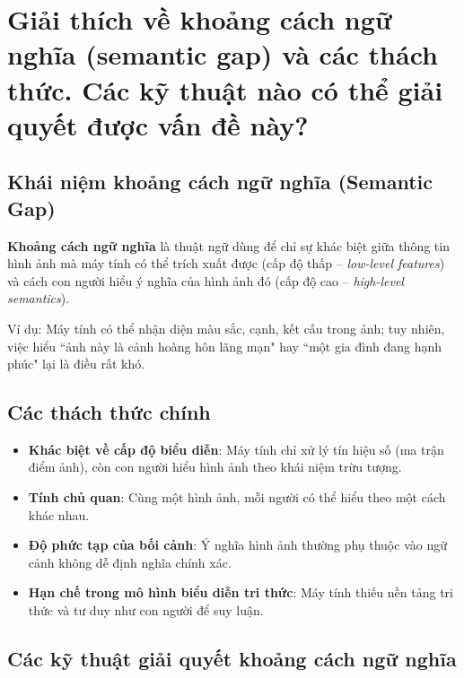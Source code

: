 \documentclass[12pt]{article}
\begin{document}
	\section{Giải thích về khoảng cách ngữ nghĩa (semantic gap) và các thách thức. Các kỹ thuật nào có thể giải quyết được vấn đề này?}
	
	\subsection{Khái niệm khoảng cách ngữ nghĩa (Semantic Gap)}
	
	\textbf{Khoảng cách ngữ nghĩa} là thuật ngữ dùng để chỉ sự khác biệt giữa thông tin hình ảnh mà máy tính có thể trích xuất được (cấp độ thấp -- \textit{low-level features}) và cách con người hiểu ý nghĩa của hình ảnh đó (cấp độ cao -- \textit{high-level semantics}).
	
	Ví dụ: Máy tính có thể nhận diện màu sắc, cạnh, kết cấu trong ảnh; tuy nhiên, việc hiểu ``ảnh này là cảnh hoàng hôn lãng mạn" hay ``một gia đình đang hạnh phúc" lại là điều rất khó.
	
	\subsection{Các thách thức chính}
	
	\begin{itemize}
	\item \textbf{Khác biệt về cấp độ biểu diễn}: Máy tính chỉ xử lý tín hiệu số (ma trận điểm ảnh), còn con người hiểu hình ảnh theo khái niệm trừu tượng.
	\item \textbf{Tính chủ quan}: Cùng một hình ảnh, mỗi người có thể hiểu theo một cách khác nhau.
	\item \textbf{Độ phức tạp của bối cảnh}: Ý nghĩa hình ảnh thường phụ thuộc vào ngữ cảnh không dễ định nghĩa chính xác.
	\item \textbf{Hạn chế trong mô hình biểu diễn tri thức}: Máy tính thiếu nền tảng tri thức và tư duy như con người để suy luận.
	\end{itemize}
	
	\subsection{Các kỹ thuật giải quyết khoảng cách ngữ nghĩa}
	
\end{document}
